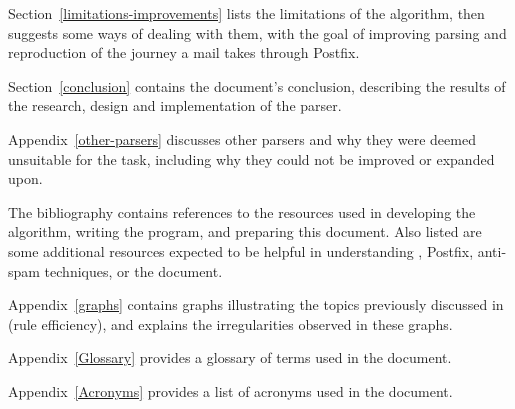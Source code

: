 Section~\ref{limitations-improvements} lists the limitations of the
algorithm, then suggests some ways of dealing with them, with the goal of
improving parsing and reproduction of the journey a mail takes through
Postfix.

Section~\ref{conclusion} contains the document's conclusion, describing the
results of the research, design and implementation of the parser.

Appendix~\ref{other-parsers} discusses other parsers and why they were
deemed unsuitable for the task, including why they could not be improved or
expanded upon.

The bibliography contains references to the resources used in developing
the algorithm, writing the program, and preparing this document.  Also
listed are some additional resources expected to be helpful in
understanding \SMTP{}, Postfix, anti-spam techniques, or the document.

Appendix~\ref{graphs} contains graphs illustrating the topics previously
discussed in  (rule efficiency), and explains
the irregularities observed in these graphs.

Appendix~\ref{Glossary} provides a glossary of terms used in the document.

Appendix~\ref{Acronyms} provides a list of acronyms used in the document.


